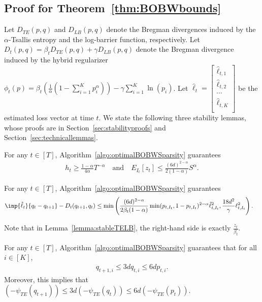 \subsection{Proof for Theorem~\ref{thm:BOBWbounds}}
Let $D_{TE}(p,q)$ and $D_{LB}(p,q)$ denote the Bregman divergences induced by the $\alpha$-Tsallis entropy and the log-barrier function, respectively. Let $D_t(p,q) = \beta_t D_{TE}(p,q) + \gamma D_{LB}(p, q)$ denote the Bregman divergence induced by the hybrid regularizer $\phi_t(p) = \beta_t\left(\frac{1}{\alpha}(1-\sum_{i=1}^K p_i^\alpha)\right) - \gamma\sum_{i=1}^K \ln(p_i)$.
Let $\hat{\ell}_t = \begin{bmatrix}
    \hat{\ell}_{t,1} \\
    \hat{\ell}_{t,2} \\
    \cdots \\
    \hat{\ell}_{t,K} \\
\end{bmatrix}$ be the estimated loss vector at time $t$. We state the following three stability lemmas, whose proofs are in Section~\ref{sec:stabilityproofs} and Section~\ref{sec:technicallemmas}.
\begin{lemma}
    For any $t \in [T]$, Algorithm~\ref{algo:optimalBOBWSparsity} guarantees
    \begin{align*}
        h_t \geq \frac{1-\alpha}{4\alpha}T^{-\alpha} \quad{\text{and}}\quad E_{I_t}[z_t] \leq \frac{(6d)^{2-\alpha}}{2(1-\alpha)} S^{\alpha}.
    \end{align*}
    \label{lemma:minhtAndmaxEzt}
\end{lemma}
\begin{lemma}
    For any $t \in [T]$, Algorithm~\ref{algo:optimalBOBWSparsity} guarantees
    \begin{align}
        \inp{\hat{\ell}_t}{q_{t} - q_{t+1}} - D_t(q_{t+1}, q_t) &\leq \min\left( \frac{(6d)^{2-\alpha}}{2\beta_t(1-\alpha)}\min(p_{t,I_t}, 1 - p_{t,I_t})^{2-\alpha}\hat{\ell}^2_{t,I_t}, \frac{18d^2}{\gamma} \ell_{t,I_t}^2  \right).
    \end{align}
    \label{lemma:stableTELB}
\end{lemma}
Note that in Lemma~\ref{lemma:stableTELB}, the right-hand side is exactly $\frac{z_t}{\beta_t}$.
\begin{lemma}
    For any $t \in [T]$, Algorithm~\ref{algo:optimalBOBWSparsity} guarantees that for all $i \in [K]$,
    \begin{align}
        q_{t+1, i} \leq 3dq_{t,i} \leq 6dp_{t,i}.
    \end{align}
    Moreover, this implies that $(-\psi_{TE}(q_{t+1})) \leq 3d(-\psi_{TE}(q_t)) \leq 6d(-\psi_{TE}(p_t))$.
    \label{lemma:boundhtplus1byht}
\end{lemma}
